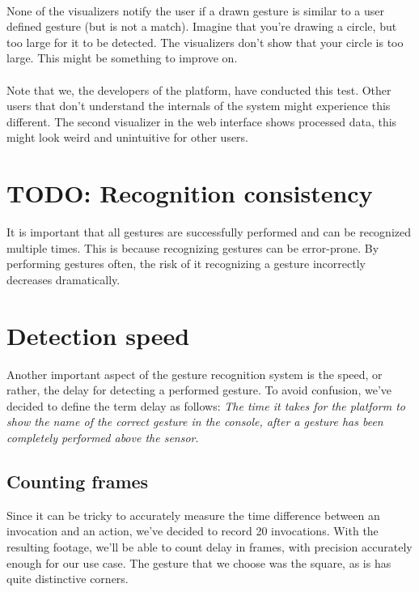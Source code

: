 \documentclass[a4paper]{article}
\begin{document}
  \paragraph{}
  None of the visualizers notify the user if a drawn gesture is similar to a
  user defined gesture (but is not a match). Imagine that you're drawing a
  circle, but too large for it to be detected. The visualizers don't show that
  your circle is too large. This might be something to improve on.

  \paragraph{}
  Note that we, the developers of the platform, have conducted this test. Other
  users that don't understand the internals of the system might experience this
  different. The second visualizer in the web interface shows processed data,
  this might look weird and unintuitive for other users.

  \clearpage

  \section*{TODO: Recognition consistency}
  It is important that all gestures are successfully performed and can be recognized
  multiple times. This is because recognizing gestures can be error-prone. By
  performing gestures often, the risk of it recognizing a gesture incorrectly
  decreases dramatically.

  \clearpage

  \section*{Detection speed}
  Another important aspect of the gesture recognition system is the speed, or
  rather, the delay for detecting a performed gesture. To avoid confusion, we've
  decided to define the term delay as follows: \textit{The time it takes for the
    platform to show the name of the correct gesture in the console, after a
    gesture has been completely performed above the sensor}.

  \subsection*{Counting frames}
  Since it can be tricky to accurately measure the time difference between an
  invocation and an action, we've decided to record 20 invocations.
  With the resulting footage, we'll be able to count delay in
  frames, with precision accurately enough for our use case. The gesture that we
  choose was the square, as is has quite distinctive corners.
\end{document}
